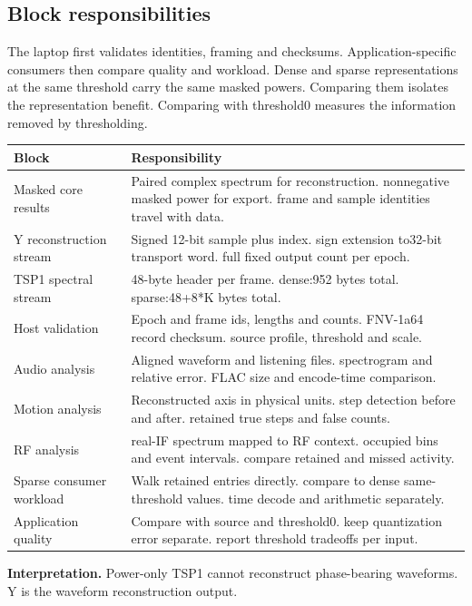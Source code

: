 \documentclass[11pt,letterpaper]{article}
\begin{document}
\subsection*{Block responsibilities}
The laptop first validates identities, framing and checksums. Application-specific consumers then compare quality and workload. Dense and sparse representations at the same threshold carry the same masked powers. Comparing them isolates the representation benefit. Comparing with threshold0 measures the information removed by thresholding.
\par\medskip\noindent
\begin{tabularx}{\linewidth}{@{}>{\raggedright\arraybackslash}p{1.65in}Y@{}}\toprule
\textbf{Block} & \textbf{Responsibility} \\ \midrule
Masked core results & Paired complex spectrum for reconstruction. nonnegative masked power for export. frame and sample identities travel with data. \\[5pt]
Y reconstruction stream & Signed 12-bit sample plus index. sign extension to32-bit transport word. full fixed output count per epoch. \\[5pt]
TSP1 spectral stream & 48-byte header per frame. dense:952 bytes total. sparse:48+8*K bytes total. \\[5pt]
Host validation & Epoch and frame ids, lengths and counts. FNV-1a64 record checksum. source profile, threshold and scale. \\[5pt]
Audio analysis & Aligned waveform and listening files. spectrogram and relative error. FLAC size and encode-time comparison. \\[5pt]
Motion analysis & Reconstructed axis in physical units. step detection before and after. retained true steps and false counts. \\[5pt]
RF analysis & real-IF spectrum mapped to RF context. occupied bins and event intervals. compare retained and missed activity. \\[5pt]
Sparse consumer workload & Walk retained entries directly. compare to dense same-threshold values. time decode and arithmetic separately. \\[5pt]
Application quality & Compare with source and threshold0. keep quantization error separate. report threshold tradeoffs per input. \\[5pt]
\bottomrule\end{tabularx}
\vspace{8pt}
\noindent\textbf{Interpretation.} Power-only TSP1 cannot reconstruct phase-bearing waveforms. Y is the waveform reconstruction output.
\clearpage
\end{document}
